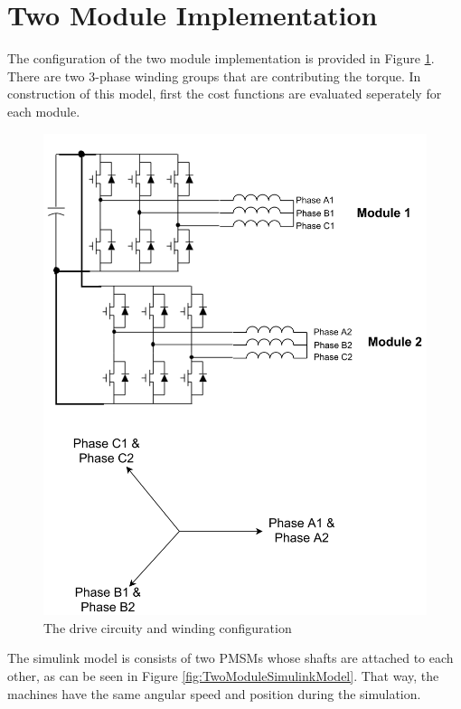 \documentclass{article}
\begin{document}
\section{Two Module Implementation}

The configuration of the two module implementation is provided in Figure \ref{fig:DriveSystem}. There are two 3-phase winding groups that are contributing the torque. In construction of this model, first the cost functions are evaluated seperately for each module. 

\begin{figure}[H]
\centering
\includegraphics[scale=0.6]{Figures/Drive_System.png}
\caption{The drive circuity and winding configuration}
\label{fig:DriveSystem}
\end{figure}

\newpage

The simulink model is consists of two PMSMs whose shafts are attached to each other, as can be seen in Figure \ref{fig:TwoModuleSimulinkModel}. That way, the machines have the same angular speed and position during the simulation.
\end{document}
